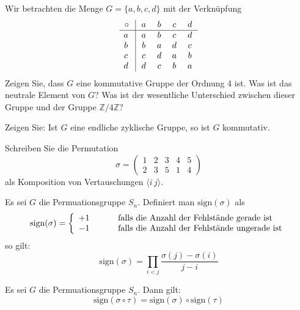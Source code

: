 \begin{aufgabe} Wir betrachten die Menge $G = \{ a, b ,c , d \} $ mit der Verknüpfung
  	$$ \begin{array} { c | c c c c }
  	\circ \, & \, a \, & \, b \,  & \, c \, & \, d \, \\ \hline
  	a\, \, & a & b & c & d \\
  	b\, \, & b & a & d & c \\
  	c\, \, & c & d & a & b \\
  	d\, \, & d & c & b & a 
  	\end{array} $$
Zeigen Sie, dass $G$ eine kommutative Gruppe der Ordnung 4 ist. Was ist das neutrale Element von $G$? 
Was ist der wesentliche Unterschied zwischen dieser 
Gruppe und der Gruppe $\mathbb Z / 4 \mathbb Z$?
\end{aufgabe}

\begin{aufgabe} Zeigen Sie: Ist $G$ eine endliche zyklische Gruppe, so ist $G$ kommutativ.
\end{aufgabe}

\begin{aufgabe} Schreiben Sie die Permutation
  	$$ \sigma = \left( \begin{matrix} 1 & 2 & 3 & 4 & 5 \\ 2 & 3 & 5 & 1 & 4 \end{matrix} \right) $$
als Komposition von Vertauschungen $\langle i \, j \rangle$.
\end{aufgabe}


\begin{aufgabe}\label{gruppe_aufg_permut_1} 
Es sei $G$ die Permuationsgruppe $S_n$. Definiert man $\textrm{sign}(\sigma)$ als 
  	$$ \textrm{sign}(\sigma) = \left\{ \begin{array} {l c l}
	+1 & \quad &\textrm{ falls die Anzahl der Fehlstände gerade ist} \\
	-1 & \quad &\textrm{ falls die Anzahl der Fehlstände ungerade ist} 
 	\end{array} \right. $$
so gilt: 
  	$$ \textrm{sign}(\sigma) = \prod_{i<j} \frac {\sigma(j) - \sigma(i)}{j - i} $$
\end{aufgabe}

\begin{aufgabe}\label{gruppe_aufg_permut_2} 
Es sei $G$ die Permuationsgruppe $S_n$. Dann gilt:
  	$$ \textrm{sign}(\sigma \circ \tau) = \textrm{sign}(\sigma) \circ \textrm{sign}(\tau) $$
\end{aufgabe}

